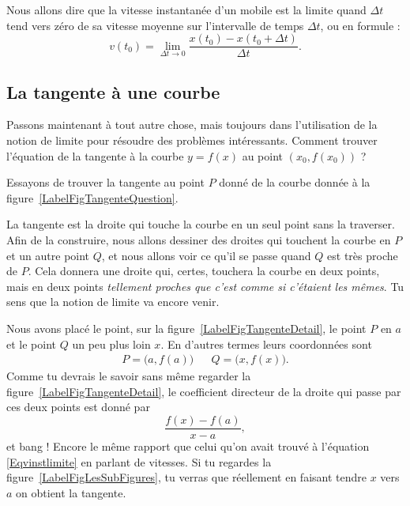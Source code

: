 Nous allons dire que la vitesse instantanée d'un mobile est la limite quand $\Delta t$ tend vers zéro de sa vitesse moyenne sur l'intervalle de temps $\Delta t$, ou en formule :
\begin{equation}		\label{Eqvinstlimite}
	v(t_0)=\lim_{\Delta t\to 0}\frac{ x(t_0)-x(t_0+\Delta t) }{ \Delta t }.
\end{equation}

\subsection{La tangente à une courbe}

Passons maintenant à tout autre chose, mais toujours dans l'utilisation de la notion de limite pour résoudre des problèmes intéressants. Comment trouver l'équation de la tangente à la courbe $y=f(x)$ au point $(x_0,f(x_0))$ ?

Essayons de trouver la tangente au point $P$ donné de la courbe donnée à la figure~\ref{LabelFigTangenteQuestion}.

\newcommand{\CaptionFigTangenteQuestion}{Comment trouver la tangente à la courbe au point $P$ ?}


La tangente est la droite qui touche la courbe en un seul point sans la traverser. Afin de la construire, nous allons dessiner des droites qui touchent la courbe en $P$ et un autre point $Q$, et nous allons voir ce qu'il se passe quand $Q$ est très proche de $P$. Cela donnera une droite qui, certes, touchera la courbe en deux points, mais en deux points \emph{tellement proches que c'est comme si c'étaient les mêmes}. Tu sens que la notion de limite va encore venir.

\newcommand{\CaptionFigTangenteDetail}{Traçons d'abord une corde entre le point $P$ et un point $Q$ un peu plus loin.}


Nous avons placé le point, sur la figure~\ref{LabelFigTangenteDetail}, le point $P$ en $a$ et le point $Q$ un peu plus loin $x$. En d'autres termes leurs coordonnées sont
\begin{align}
	P=\big(a,f(a)\big)&& Q=\big(x,f(x)\big).
\end{align}
Comme tu devrais le savoir sans même regarder la figure~\ref{LabelFigTangenteDetail}, le coefficient directeur de la droite qui passe par ces deux points est donné par
\begin{equation}
	\frac{ f(x)-f(a) }{ x-a },
\end{equation}
et bang ! Encore le même rapport que celui qu'on avait trouvé à l'équation \eqref{Eqvinstlimite} en parlant de vitesses. Si tu regardes la figure~\ref{LabelFigLesSubFigures}, tu verras que réellement en faisant tendre $x$ vers $a$ on obtient la tangente.

